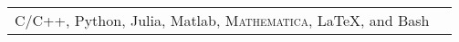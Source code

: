\renewcommand{\arraystretch}{1.1}

	\begin{tabular}{>{}r>{}p{13cm}} 
		C/C++, Python, Julia, Matlab, \textsc{Mathematica}, \LaTeX, and Bash
	\end{tabular}
